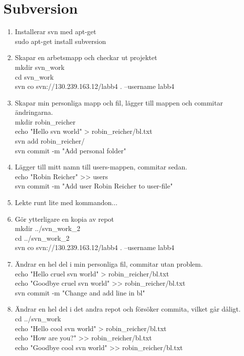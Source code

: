 \documentclass[11pt]{article}
\begin{document}
\section{Subversion}
\begin{enumerate}
\item Installerar svn med apt-get \\
sudo apt-get install subversion
\item Skapar en arbetsmapp och checkar ut projektet\\
mkdir svn\_work \\
cd svn\_work \\
svn co svn://130.239.163.12/labb4 . --username labb4
\item Skapar min personliga mapp och fil, lägger till mappen och commitar ändringarna. \\
mkdir robin\_reicher \\
echo "Hello svn world" > robin\_reicher/bl.txt \\
svn add robin\_reicher/ \\
svn commit -m "Add personal folder"
\item Lägger till mitt namn till users-mappen, commitar sedan. \\
echo "Robin Reicher" >> users \\
svn commit -m "Add user Robin Reicher to user-file"
\item Lekte runt lite med kommandon...
\item Gör ytterligare en kopia av repot \\
mkdir ../svn\_work\_2 \\
cd ../svn\_work\_2 \\
svn co svn://130.239.163.12/labb4 . --username labb4
\item Ändrar en hel del i min personliga fil, commitar utan problem. \\
echo "Hello cruel svn world" > robin\_reicher/bl.txt \\
echo "Goodbye cruel svn world" >> robin\_reicher/bl.txt \\ 
svn commit -m "Change and add line in bl"
\item Ändrar en hel del i det andra repot och försöker commita, vilket går dåligt. \\
cd ../svn\_work \\
echo "Hello cool svn world" > robin\_reicher/bl.txt \\
echo "How are you?" >> robin\_reicher/bl.txt \\
echo "Goodbye cool svn world" >> robin\_reicher/bl.txt \\

\end{enumerate}
\end{document}
